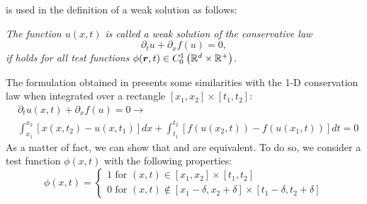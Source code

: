 %
 is used in the definition of a weak solution as follows:
%
\begin{definition}
\emph{The function $u(x,t)$ is called a weak solution of the conservative law
%
\begin{equation}
\partial_t u + \partial_x f(u) = 0, \nonumber
\end{equation}
%
if  holds for all test functions $\phi(\boldsymbol r, t) \in C_0^1 \left( \mathbb{R}^d \times \mathbb{R}^+ \right)$.}
\end{definition}
%
The formulation obtained in  presents some similarities with the 1-D conservation law when integrated over a rectangle $\left[ x_1,x_2 \right] \times \left[ t_1,t_2 \right]$:
%
\begin{align}\label{eq:weak_sol4_sct1b}
&\partial_t u(x,t) + \partial_x f(u) = 0 \to \nonumber \\
&\int_{x_1}^{x_2} \left[ x(x,t_2) - u(x,t_1) \right] dx + 
\int_{t_1}^{t_2} \left[ f(u(x_2,t)) - f(u(x_1,t)) \right]dt = 0
\end{align}
%
As a matter of fact, we can show that  and  are equivalent. To do so, we consider a test function $\phi(x,t)$ with the following properties:
%
\begin{equation}\label{eq:weak_sol5_sct1b}
\phi(x,t) = \left\{
\begin{array}{l}
1  \text{ for }  (x,t) \in \left[ x_1,x_2 \right] \times \left[ t_1,t_2 \right]  \\
0 \text{ for } (x,t) \notin \left[ x_1-\delta,x_2+\delta \right] \times \left[ t_1-\delta,t_2+\delta \right]
\end{array}\right.
\end{equation}
%
